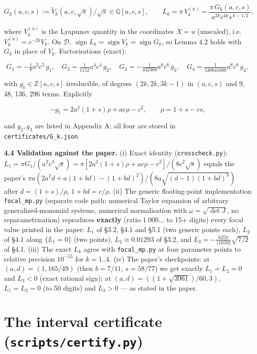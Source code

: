 \documentclass[11pt,a4paper]{report}
\begin{document}
\[G_k(a,c,s):=\tilde V_k(a,c,\sqrt s)/\sqrt s\in\mathbb Q[a,c,s],\qquad
L_k=\pi\,V_k^{(u)}=\frac{\pi\,G_k(a,c,s)}{a^{2k}c^{4k}s^{\,k-1/2}},\]

where \(V_k^{(u)}\) is the Lyapunov quantity in the coordinates \(X=u\) (unscaled), i.e.~\(V^{(u)}_k=c^{-2k}V_k\).
On \(\mathcal D\), \(\operatorname{sign}L_k=\operatorname{sign}V_k=\operatorname{sign}G_k\), so Lemma 4.2 holds with
\(G_k\) in place of \(V_k\). Factorisations (exact):

\[G_1=-\tfrac18 a^2c^2\,g_1,\quad G_2=\tfrac1{1152}a^4c^4\,g_2,\quad G_3=-\tfrac1{442368}a^6c^6\,g_3,\quad
G_4=\tfrac1{530841600}a^8c^8\,g_4,\]

with \(g_k\in\mathbb Z[a,c,s]\) irreducible, of degrees \((2k,2k,3k-1)\) in \((a,c,s)\) and 9, 48, 136, 296
terms. Explicitly

\[-g_1=2a^2(1+s)\rho+ac\rho-c^2,\qquad \rho=1+s-cs,\]

and \(g_2,g_3\) are listed in Appendix A; all four are stored in \texttt{certificates/G\_k.json}.

\textbf{4.4 Validation against the paper.} (i) Exact identity (\texttt{crosscheck.py}): \(L_1=\pi G_1/(a^2c^4\sqrt s)
=\pi[2a^2(1+s)\rho+ac\rho-c^2]/(8c^2\sqrt s)\) equals the paper's
\(\pi a(2a^2d+a(1+bd)-(1+bd)^2)/(8a\sqrt{(d-1)(1+bd)^3})\) after \(d=(1+s)/\rho\), \(1+bd=c/\rho\).
(ii) The generic floating-point implementation \texttt{focal\_mp.py} (separate code path: numerical Taylor
expansion of arbitrary generalized-monomial systems, numerical normalisation with \(\omega=\sqrt{\det J}\), no
reparametrisation) reproduces \textbf{exactly} (ratio \(1.000\ldots\) to 15+ digits) every focal value printed in
the paper: \(L_1\) of §3.2, §4.1 and §5.1 (two generic points each), \(L_2\) of §4.1 along \(\{L_1=0\}\) (two
points), \(L_2\approx0.01293\) of §3.2, and \(L_3=-\frac{625\pi}{110592}\sqrt{7/2}\) of §4.1. (iii) The exact
\(L_k\) agree with \texttt{focal\_mp.py} at four parameter points to relative precision \(10^{-55}\) for \(k=1..4\).
(iv) The paper's checkpoints: at \((a,d)=(1,165/49)\) (then \(b=7/11\), \(s=58/77\)) we get exactly
\(L_1=L_2=0\) and \(L_3<0\) (exact rational sign); at \((a,d)=((1+\sqrt{3961})/60,3)\), \(L_1=L_2=0\) (to 50
digits) and \(L_3>0\) --- as stated in the paper.

\section{\texorpdfstring{The interval certificate (\texttt{scripts/certify.py})}{The interval certificate (scripts/certify.py)}}
\end{document}
